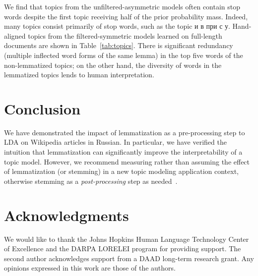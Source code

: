 \documentclass[11pt,letterpaper]{article}
\begin{document}
We find that topics from the unfiltered-asymmetric models often contain
stop words despite the first topic receiving half of the prior
probability mass.  Indeed, many topics consist primarily of stop
words, such as the topic {и в при с у}.
Hand-aligned topics from the filtered-symmetric models learned on
full-length documents are shown in Table~\ref{tab:topics}.
There is significant redundancy (multiple inflected word forms of the
same lemma) in the top five words of the non-lemmatized topics; on the
other hand, the diversity of words in the lemmatized topics lends
to human interpretation.


\section{Conclusion}\label{sec:conclusion}

We have demonstrated the impact of lemmatization as a pre-processing
step to LDA on Wikipedia articles in Russian.  In particular, we have
verified the intuition that lemmatization can significantly improve the
interpretability of a topic model.
However, we recommend measuring rather than assuming the effect of
lemmatization (or stemming) in a new topic modeling application
context, otherwise stemming as a \emph{post-processing} step as
needed~\cite{schofield2016}.

\section*{Acknowledgments}\label{sec:ack}
    We would like to thank the Johns Hopkins Human Language Technology
    Center of Excellence and the DARPA LORELEI program for providing
    support.
    The second author acknowledges support from a DAAD long-term
    research grant.
    Any opinions expressed in this work are those of the authors.




\end{document}
